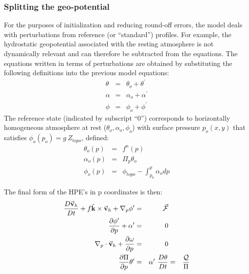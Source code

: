 \subsubsection{Splitting the geo-potential}

For the purposes of initialization and reducing round-off errors, the model
deals with perturbations from reference (or ``standard'') profiles. For
example, the hydrostatic geopotential associated with the resting atmosphere
is not dynamically relevant and can therefore be subtracted from the
equations. The equations written in terms of perturbations are obtained by
substituting the following definitions into the previous model equations: 
\begin{eqnarray*}
\theta &=&\theta _{o}+\theta ^{\prime } \label{eq:atmos-ref-prof-theta} \\
\alpha &=&\alpha _{o}+\alpha ^{\prime }  \label{eq:atmos-ref-prof-alpha}\\
\phi &=&\phi _{o}+\phi ^{\prime } \label{eq:atmos-ref-prof-phi}
\end{eqnarray*}
The reference state (indicated by subscript ``0'') corresponds to
horizontally homogeneous atmosphere at rest ($\theta _{o},\alpha _{o},\phi
_{o}$) with surface pressure $p_{o}(x,y)$ that satisfies $\phi
_{o}(p_{o})=g~Z_{topo}$, defined: 
\begin{eqnarray*}
\theta _{o}(p) &=&f^{n}(p) \\
\alpha _{o}(p) &=&\Pi _{p}\theta _{o} \\
\phi _{o}(p) &=&\phi _{topo}-\int_{p_{0}}^{p}\alpha _{o}dp
\end{eqnarray*}

The final form of the HPE's in p coordinates is then: 
\begin{eqnarray}
\frac{D\vec{\mathbf{v}}_{h}}{Dt}+f\hat{\mathbf{k}}\times \vec{\mathbf{v}}%
_{h}+\mathbf{\nabla }_{p}\phi ^{\prime } &=&\vec{\mathbf{\mathcal{F}}}
                  \\
\frac{\partial \phi ^{\prime }}{\partial p}+\alpha ^{\prime } &=&0
                   \\
\mathbf{\nabla }_{p}\cdot \vec{\mathbf{v}}_{h}+\frac{\partial \omega }{%
\partial p} &=&0                    \\
\frac{\partial \Pi }{\partial p}\theta ^{\prime } &=&\alpha ^{\prime }
                  \
\frac{D\theta }{Dt} &=&\frac{\mathcal{Q}}{\Pi }  \label{eq:atmos-prime}
\end{eqnarray}
